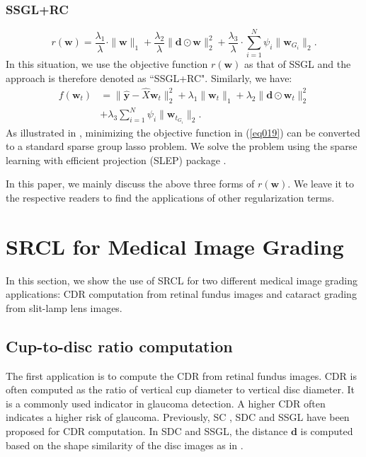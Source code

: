 \documentclass[journal]{IEEEtran}
\begin{document}
% 
  \subsubsection{SSGL+RC}
 \begin{equation} r(\textbf{w})=\frac{\lambda_1}{\lambda} \cdot
  \|\textbf{w}\|_1+\frac{\lambda_2}{\lambda}\|\textbf{d} \odot \textbf{w} \|_2^2+ \frac{\lambda_3}{\lambda} \cdot  \sum_{i=1}^N\psi_i\|\textbf{w}_{G_i}\|_2. 
  \end{equation}
   In this situation, we use the objective function $r(\textbf{w})$ as that of SSGL \cite{Cheng:17BOE} and the approach is therefore denoted as ``SSGL+RC".
  Similarly, we have:
   \begin{align} f(\textbf{w}_t)&=\|\hat{\textbf{y}}-\hat{X}\textbf{w}_t\|^2_2+ \lambda_1 \|\textbf{w}_t\|_1+ \lambda_2\| \textbf{d}\odot \textbf{w}_t\|_2^2 \nonumber
   \\ &+\lambda_3   \sum_{i=1}^N\psi_i\|\textbf{w}_{t_{G_i}}\|_2.  \label{eq019}
  \end{align} 
  As illustrated in \cite{Cheng:17BOE}, minimizing the objective function in (\ref{eq019}) can be converted to a standard sparse group lasso problem. We solve the
  problem using the sparse learning with efficient projection (SLEP) package \cite{Liu:2009:SLEP:manual}.
 
 In this paper, we mainly discuss the above three forms of $r(\textbf{w})$.   We leave it to the respective readers to find the applications of other  regularization terms. 
 
 
\section{SRCL for Medical Image Grading} \label{application}
In this section, we show the use of SRCL for two different medical image grading applications: CDR computation from retinal fundus images and cataract grading from slit-lamp lens images.
\subsection{Cup-to-disc ratio computation}
The first application is to compute the CDR from retinal fundus images. CDR is often computed as the ratio of vertical cup diameter to vertical disc diameter.
 It is a commonly used indicator in glaucoma detection. 
  A higher CDR often indicates a higher risk of glaucoma. Previously, %
SC \cite{sparsecoding}, SDC \cite{CJ15}  and SSGL\cite{Cheng:17BOE} have been proposed for CDR computation. In SDC and SSGL,  the distance   $\textbf{d}$ is computed  based on  the shape similarity of the disc images as in \cite{CJ15}.  
 
\end{document}
